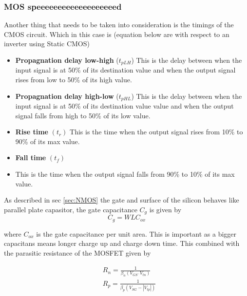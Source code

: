 \subsubsection{MOS speeeeeeeeeeeeeeeeeeed}
Another thing that needs to be taken into consideration is the timings of the CMOS circuit. Which in this case is (equation below are with respect to an inverter using Static CMOS) \cite{departmentofelectronicsystemsntnu_2023_delay}
\begin{itemize}
    \item \textbf{Propagnation delay low-high} ($t_{pLH}$)
    \subitem This is the delay between when the input signal is at 50\% of its destination value and when the output signal rises from low to 50\% of its high value.
    \item \textbf{Propagnation delay high-low} ($t_{pHL}$)
    \subitem This is the delay between when the input signal is at 50\% of its destination value value and when the output signal falls from high to 50\% of its low value.\cite{wikipediacontributors_2023_signal}
    \item \textbf{Rise time} $\left(t_r\right)$
    \subitem This is the time when the output signal rises from 10\% to 90\% of its max value.
    \item \textbf{Fall time} $\left(t_f\right)$
    \item \subitem This is the time when the output signal falls from 90\% to 10\% of its max value.
\end{itemize}



As described in sec \ref{sec:NMOS} the gate and surface of the silicon behaves like parallel plate capasitor, the gate capacitance $C_g$ is given by \cite[p. 18]{carusone_2012_analog}
\begin{equation}
    C_g=WLC_{ox}
\end{equation}

where $C_{ox}$ is the gate capacitance per unit area. This is important as a bigger capacitans means longer charge up and charge down time. This combined with the parasitic resistance of the MOSFET given by \cite{departmentofelectronicsystemsntnu_2023_delay}

\begin{equation}
    \begin{aligned}
    & R_n=\frac{1}{\beta_n\left(V_{G S^{-}} V_{t n}\right)} \\
    & R_p=\frac{1}{\beta_p\left(V_{S G}-\left|V_{t p}\right|\right)}
    \end{aligned}
\end{equation}

